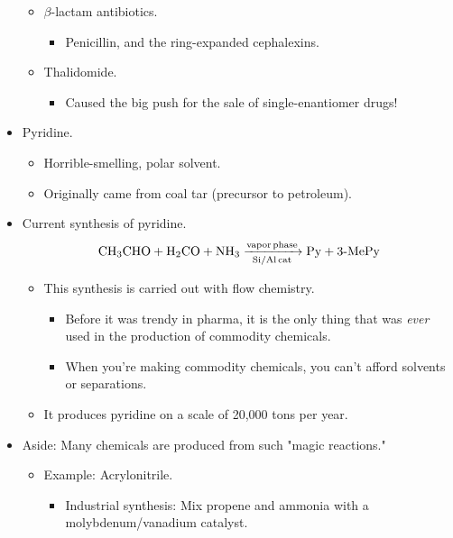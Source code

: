 \documentclass[../notes.tex]{subfiles}
\begin{document}
\begin{itemize}
\begin{itemize}
\begin{itemize}
        \end{itemize}
        \item $\beta$-lactam antibiotics.
        \begin{itemize}
            \item Penicillin, and the ring-expanded cephalexins.
        \end{itemize}
        \item Thalidomide.
        \begin{itemize}
            \item Caused the big push for the sale of single-enantiomer drugs!
        \end{itemize}
    \end{itemize}
    \item Pyridine.
    \begin{itemize}
        \item Horrible-smelling, polar solvent.
        \item Originally came from coal tar (precursor to petroleum).
    \end{itemize}
    \item Current synthesis of pyridine.
    \begin{equation*}
        \ce{CH3CHO + H2CO + NH3 ->[vapor phase][Si/Al cat] Py + 3-MePy}
    \end{equation*}
    \begin{itemize}
        \item This synthesis is carried out with flow chemistry.
        \begin{itemize}
            \item Before it was trendy in pharma, it is the only thing that was \emph{ever} used in the production of commodity chemicals.
            \item When you're making commodity chemicals, you can't afford solvents or separations.
        \end{itemize}
        \item It produces pyridine on a scale of 20,000 tons per year.
    \end{itemize}
    \item Aside: Many chemicals are produced from such "magic reactions."
    \begin{itemize}
        \item Example: Acrylonitrile.
        \begin{itemize}
            \item Industrial synthesis: Mix propene and ammonia with a molybdenum/vanadium catalyst.

\end{itemize}
\end{itemize}
\end{itemize}
\end{document}
